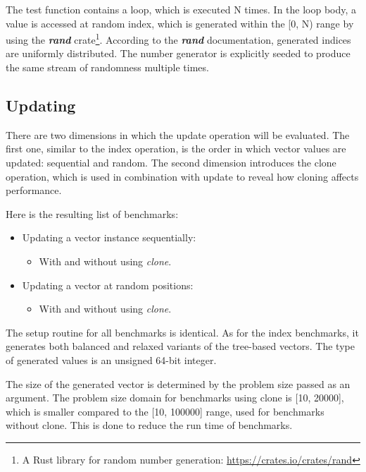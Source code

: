 The test function contains a loop, which is executed N times. In the loop body, a value is accessed at random index, which is generated within the [0, N) range by using the \emph{\textbf{rand}} crate\footnote{A Rust library for random number generation: \url{https://crates.io/crates/rand}}. According to the \emph{\textbf{rand}} documentation, generated indices are uniformly distributed. The number generator is explicitly seeded to produce the same stream of randomness multiple times.

\subsection{Updating}
There are two dimensions in which the update operation will be evaluated. The first one, similar to the index operation, is the order in which vector values are updated: sequential and random. The second dimension introduces the clone operation, which is used in combination with update to reveal how cloning affects performance. 

Here is the resulting list of benchmarks:
\begin{itemize}
    \item Updating a vector instance sequentially:
    \begin{itemize}        
        \item With and without using \emph{clone}.
    \end{itemize}
    \item Updating a vector at random positions:
    \begin{itemize}
        \item With and without using \emph{clone}.
    \end{itemize}  
\end{itemize}

The setup routine for all benchmarks is identical. As for the index benchmarks, it generates both balanced and relaxed variants of the tree-based vectors. The type of generated values is an unsigned 64-bit integer. 

The size of the generated vector is determined by the problem size passed as an argument. The problem size domain for benchmarks using clone is [10, 20000], which is smaller compared to the [10, 100000] range, used for benchmarks without clone. This is done to reduce the run time of benchmarks. 

